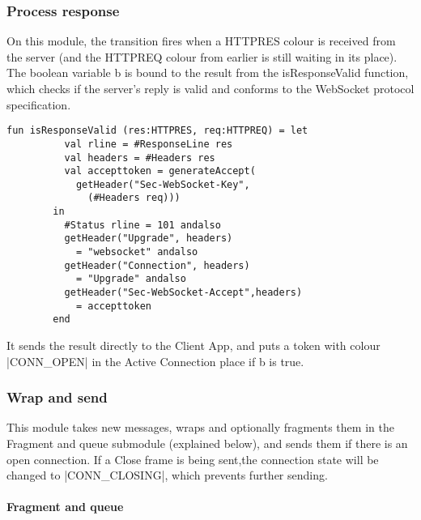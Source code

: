 		
		
	\subsubsection{Process response}
		
		
		On this module, the transition fires when a HTTPRES colour is received from the
		server (and the HTTPREQ colour from earlier is still waiting in its place). The
		boolean variable b is bound to the result from the isResponseValid function,
		which checks if the server's reply is valid and conforms to the WebSocket
		protocol specification.
		
		\begin{lstlisting}[label=lst:isResponseValid,caption=isResponseValid,gobble=2]
		fun isResponseValid (res:HTTPRES, req:HTTPREQ) = let
		  val rline = #ResponseLine res
		  val headers = #Headers res
		  val accepttoken = generateAccept(
		    getHeader("Sec-WebSocket-Key",
		      (#Headers req)))
		in
		  #Status rline = 101 andalso
		  getHeader("Upgrade", headers) 
		    = "websocket" andalso
		  getHeader("Connection", headers) 
		    = "Upgrade" andalso
		  getHeader("Sec-WebSocket-Accept",headers)
		    = accepttoken
		end
		\end{lstlisting}
		
		It sends the result directly to the Client App, and puts a token with colour
		|CONN_OPEN| in the Active Connection place if b is true.
		
	\subsubsection{Wrap and send}
		
		
		This module takes new messages, wraps and optionally fragments them in the
		Fragment and queue submodule (explained below), and sends them if there is
		an open connection. If a Close frame is being sent,the
		connection state will be changed to |CONN_CLOSING|, which prevents
		further sending.
		
		\paragraph{Fragment and queue}
			
			
